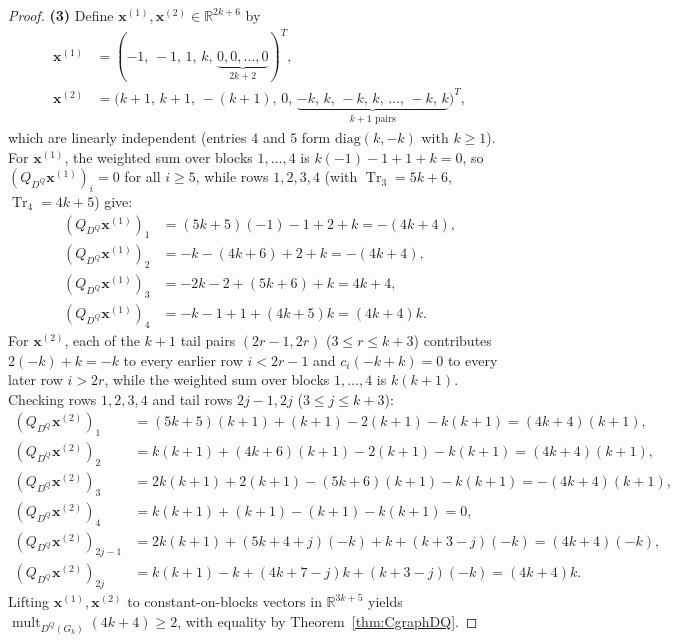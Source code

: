 \documentclass[11pt,a4paper]{article}
\theoremstyle{definition}
\DeclareMathOperator{\Tr}{Tr}
\DeclareMathOperator{\mult}{mult}
\begin{document}
\begin{proof}
  \textbf{(3)} Define $\mathbf{x}^{(1)}, \mathbf{x}^{(2)} \in \mathbb{R}^{2k+6}$ by
  \begin{align*}
    \mathbf{x}^{(1)} &= (-1,\,-1,\,1,\,k,\,\underbrace{0,0,\dots,0}_{2k+2})^T, \\
    \mathbf{x}^{(2)} &= \bigl(k+1,\,k+1,\,-(k+1),\,0,\,\underbrace{-k,\,k,\,-k,\,k,\,\dots,\,-k,\,k}_{k+1\text{ pairs}}\bigr)^T,
  \end{align*}
  which are linearly independent (entries $4$ and $5$ form $\mathrm{diag}(k,-k)$ with $k \ge 1$). For $\mathbf{x}^{(1)}$, the weighted sum over blocks $1,\dots,4$ is $k(-1) - 1 + 1 + k = 0$, so $(Q_{D^Q}\mathbf{x}^{(1)})_i = 0$ for all $i \ge 5$, while rows $1,2,3,4$ (with $\Tr_3 = 5k+6$, $\Tr_4 = 4k+5$) give:
  \begin{align*}
    (Q_{D^Q}\mathbf{x}^{(1)})_1 &= (5k+5)(-1) - 1 + 2 + k = -(4k+4), \\
    (Q_{D^Q}\mathbf{x}^{(1)})_2 &= -k - (4k+6) + 2 + k = -(4k+4), \\
    (Q_{D^Q}\mathbf{x}^{(1)})_3 &= -2k - 2 + (5k+6) + k = 4k+4, \\
    (Q_{D^Q}\mathbf{x}^{(1)})_4 &= -k - 1 + 1 + (4k+5)k = (4k+4)k.
  \end{align*}
  For $\mathbf{x}^{(2)}$, each of the $k+1$ tail pairs $(2r-1, 2r)$ ($3 \le r \le k+3$) contributes $2(-k)+k = -k$ to every earlier row $i < 2r-1$ and $c_i(-k+k) = 0$ to every later row $i > 2r$, while the weighted sum over blocks $1,\dots,4$ is $k(k+1)$. Checking rows $1,2,3,4$ and tail rows $2j-1, 2j$ ($3 \le j \le k+3$):
  \begin{align*}
    (Q_{D^Q}\mathbf{x}^{(2)})_1 &= (5k+5)(k+1) + (k+1) - 2(k+1) - k(k+1) = (4k+4)(k+1), \\
    (Q_{D^Q}\mathbf{x}^{(2)})_2 &= k(k+1) + (4k+6)(k+1) - 2(k+1) - k(k+1) = (4k+4)(k+1), \\
    (Q_{D^Q}\mathbf{x}^{(2)})_3 &= 2k(k+1) + 2(k+1) - (5k+6)(k+1) - k(k+1) = -(4k+4)(k+1), \\
    (Q_{D^Q}\mathbf{x}^{(2)})_4 &= k(k+1) + (k+1) - (k+1) - k(k+1) = 0, \\
    (Q_{D^Q}\mathbf{x}^{(2)})_{2j-1} &= 2k(k+1) + (5k+4+j)(-k) + k + (k+3-j)(-k) = (4k+4)(-k), \\
    (Q_{D^Q}\mathbf{x}^{(2)})_{2j} &= k(k+1) - k + (4k+7-j)k + (k+3-j)(-k) = (4k+4)k.
  \end{align*}
  Lifting $\mathbf{x}^{(1)}, \mathbf{x}^{(2)}$ to constant-on-blocks vectors in $\mathbb{R}^{3k+5}$ yields $\mult_{D^Q(G_k)}(4k+4) \ge 2$, with equality by Theorem~\ref{thm:CgraphDQ}.
\end{proof}
\end{document}
